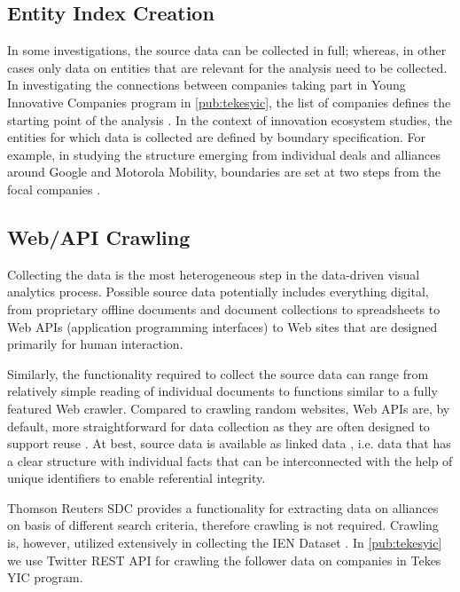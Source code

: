 \subsection{Entity Index Creation}

In some investigations, the source data can be collected in full; whereas, in other cases only data on entities that are relevant for the analysis need to be collected. In investigating the connections between companies taking part in Young Innovative Companies program in \ref{pub:tekesyic}, the list of companies defines the starting point of the analysis \citep{Huhtamaki2012NetworksFinland}. In the context of innovation ecosystem studies, the entities for which data is collected are defined by boundary specification. For example, in studying the structure emerging from individual deals and alliances around Google and Motorola Mobility, boundaries are set at two steps from the focal companies \citep{Basole2012UnderstandingApproach}.

\subsection{Web/API Crawling}

Collecting the data is the most heterogeneous step in the data-driven visual analytics process. Possible source data potentially includes everything digital, from proprietary offline documents and document collections to spreadsheets to Web APIs (application programming interfaces) to Web sites that are designed primarily for human interaction. 

Similarly, the functionality required to collect the source data can range from relatively simple reading of individual documents to functions similar to a fully featured Web crawler. Compared to crawling random websites, Web APIs are, by default, more straightforward for data collection as they are often designed to support reuse \citep{Vinoski2008}. At best, source data is available as linked data \citep{Bizer2009}, i.e. data that has a clear structure with individual facts that can be interconnected with the help of unique identifiers to enable referential integrity. 

Thomson Reuters SDC provides a functionality for extracting data on alliances on basis of different search criteria, therefore crawling is not required. Crawling is, however, utilized extensively in collecting the IEN Dataset \citep[see][]{Rubens2010LeveragingMoves}. In \ref{pub:tekesyic} we use Twitter REST API for crawling the follower data on companies in Tekes YIC program.

